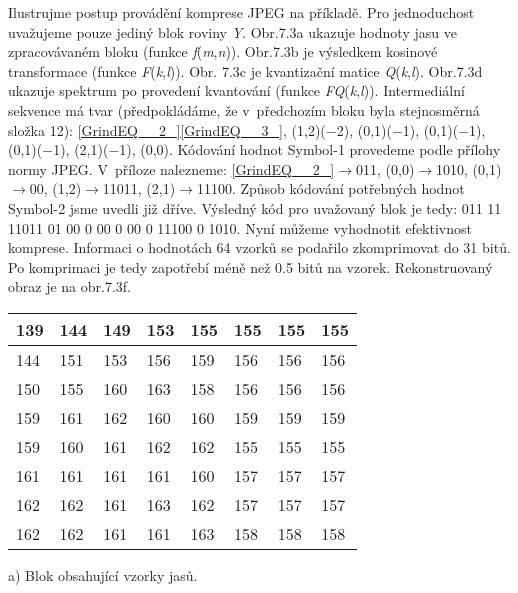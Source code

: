 \noindent Ilustrujme postup provádění komprese JPEG na příkladě. Pro jednoduchost uvažujeme pouze jediný blok roviny \textit{Y}. Obr.7.3a ukazuje hodnoty jasu ve zpracovávaném bloku (funkce \textit{f}(\textit{m},\textit{n})). Obr.7.3b je výsledkem kosinové transformace (funkce \textit{F}(\textit{k},\textit{l})). Obr. 7.3c je kvantizační matice \textit{Q}(\textit{k},\textit{l}). Obr.7.3d ukazuje spektrum po provedení kvantování (funkce \textit{FQ}(\textit{k},\textit{l})). Intermediální sekvence má tvar (předpokládáme, že v~předchozím bloku byla stejnosměrná složka 12): \eqref{GrindEQ__2_}\eqref{GrindEQ__3_}, (1,2)($-$2), (0,1)($-$1), (0,1)($-$1), (0,1)($-$1), (2,1)($-$1), (0,0). Kódování hodnot Symbol-1 provedeme podle přílohy normy JPEG. V~příloze nalezneme: \eqref{GrindEQ__2_}$\rightarrow$011, (0,0)$\rightarrow$1010, (0,1)$\rightarrow$00, (1,2)$\rightarrow$11011, (2,1)$\rightarrow$11100. Způsob kódování potřebných hodnot Symbol-2 jsme uvedli již dříve. Výsledný kód pro uvažovaný blok je tedy: 011  11  11011  01  00  0  00  0  00 0  11100  0  1010. Nyní můžeme vyhodnotit efektivnost komprese. Informaci o hodnotách 64 vzorků se podařilo zkomprimovat do 31 bitů. Po komprimaci je tedy zapotřebí méně než 0.5 bitů na vzorek. Rekonstruovaný obraz je na obr.7.3f.

\begin{tabular}{|p{0.2in}|p{0.2in}|p{0.2in}|p{0.2in}|p{0.2in}|p{0.2in}|p{0.2in}|p{0.2in}|} \hline 
139 & 144 & 149 & 153 & 155 & 155 & 155 & 155 \\ \hline 
144 & 151 & 153 & 156 & 159 & 156 & 156 & 156 \\ \hline 
150 & 155 & 160 & 163 & 158 & 156 & 156 & 156 \\ \hline 
159 & 161 & 162 & 160 & 160 & 159 & 159 & 159 \\ \hline 
159 & 160 & 161 & 162 & 162 & 155 & 155 & 155 \\ \hline 
161 & 161 & 161 & 161 & 160 & 157 & 157 & 157 \\ \hline 
162 & 162 & 161 & 163 & 162 & 157 & 157 & 157 \\ \hline 
162 & 162 & 161 & 161 & 163 & 158 & 158 & 158 \\ \hline 
\end{tabular}

a) Blok obsahující vzorky jasů.

